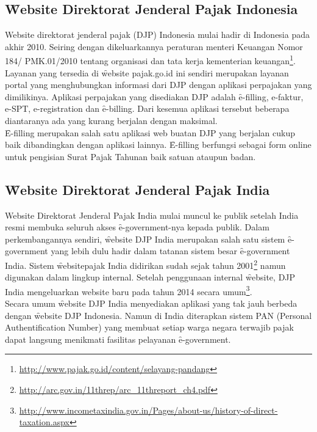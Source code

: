 \subsection{\f{Website} Direktorat Jenderal Pajak Indonesia}
Website direktorat jenderal pajak (DJP) Indonesia mulai hadir di Indonesia pada akhir 2010. Seiring dengan dikeluarkannya peraturan menteri Keuangan Nomor 184/ PMK.01/2010 tentang organisasi dan tata kerja kementerian keuangan\footnote{\url{http://www.pajak.go.id/content/selayang-pandang}}. Layanan yang tersedia di \f{website} pajak.go.id ini sendiri merupakan layanan portal yang menghubungkan informasi dari DJP dengan aplikasi perpajakan yang dimilikinya. Aplikasi perpajakan yang disediakan DJP adalah \f{e-filling, e-faktur, e-SPT, e-registration} dan \f{e-billing}. Dari kesemua aplikasi tersebut beberapa diantaranya ada yang kurang berjalan dengan maksimal. 
\newline\\
\f{E-filling} merupakan salah satu aplikasi web buatan DJP yang berjalan cukup baik dibandingkan dengan aplikasi lainnya. \f{E-filling} berfungsi sebagai form online untuk pengisian Surat Pajak Tahunan baik satuan ataupun badan.
\subsection{\f{Website} Direktorat Jenderal Pajak India}
Website Direktorat Jenderal Pajak India mulai muncul ke publik setelah India resmi membuka seluruh akses \f{e-government}-nya kepada publik. Dalam perkembangannya sendiri, \f{website} DJP India merupakan salah satu sistem \f{e-government} yang lebih dulu hadir dalam tatanan sistem besar \f{e-government} India. Sistem \f{website}pajak India didirikan sudah sejak tahun 2001\footnote{\url{http://arc.gov.in/11threp/arc_11threport_ch4.pdf}} namun digunakan dalam lingkup internal. Setelah penggunaan internal \f{website}, DJP India mengeluarkan website baru pada tahun 2014 secara umum\footnote{\url{http://www.incometaxindia.gov.in/Pages/about-us/history-of-direct-taxation.aspx}}.
\newline\\
Secara umum \f{website} DJP India menyediakan aplikasi yang tak jauh berbeda dengan \f{website} DJP Indonesia. Namun di India diterapkan sistem PAN (Personal Authentification Number) yang membuat setiap warga negara terwajib pajak dapat langsung menikmati fasilitas pelayanan \f{e-government}.
